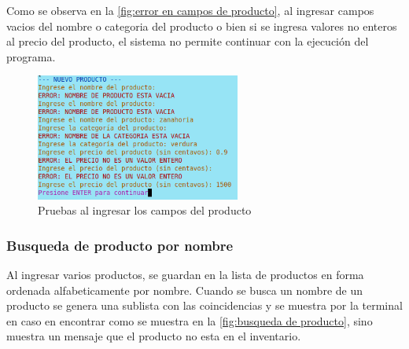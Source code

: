 \documentclass[12pt]{article}
\begin{document}
Como se observa en la \autoref{fig:error en campos de producto}, al ingresar campos vacios del nombre o categoria del producto o bien si se 
ingresa valores no enteros al precio del producto, el sistema no permite continuar con la ejecución del programa.

\begin{figure}[H]
	\centering
	\setlength{\fboxrule}{0pt}
	\includegraphics[width=0.6\textwidth]{Imagenes/errores_nuevo_producto.png}
	\caption{Pruebas al ingresar los campos del producto}
	\label{fig:error en campos de producto}
\end{figure} 

\subsubsection{Busqueda de producto por nombre}

Al ingresar varios productos, se guardan en la lista de productos en forma ordenada alfabeticamente por nombre. Cuando se busca un nombre de un producto
se genera una sublista con las coincidencias y se muestra por la terminal en caso en encontrar como se muestra en la \autoref{fig:busqueda de producto}, sino muestra un mensaje que el producto no esta en el inventario.
\end{document}
